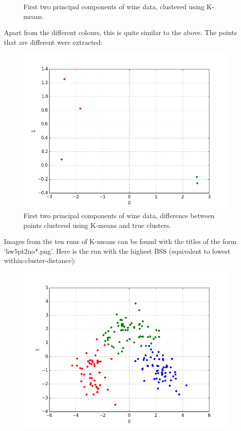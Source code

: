 \documentclass{article}
\begin{document}
\begin{enumerate}
\begin{figure}[H]
		\caption{First two principal components of wine data, clustered using K-means.}
		\end{figure}
		Apart from the different colours, this is quite similar to the above. The points that are different were extracted:
		\begin{figure}[H]
		\centering
		\includegraphics[scale=0.5]{hw5pt2afail.png}
		\caption{First two principal components of wine data, difference between points clustered using K-means and true clusters.}
		\end{figure}
		Images from the ten runs of K-means can be found with the titles of the form `hw5pt2no*.png'. Here is the run with the highest BSS (equivalent to lowest within-cluster-distance):
		\begin{figure}[H]
		\centering
		\includegraphics[scale=0.5]{hw5pt2b.png}

\end{figure}
\end{enumerate}
\end{document}
